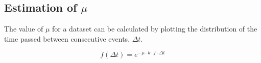 \subsection{Estimation of $\mu$}
\label{subsection: estimation of mu}

The value of $\mu$ for a dataset can be calculated by plotting the distribution of the time passed between consecutive events, $\Delta t$. 

\begin{equation}
	f(\Delta t) = e^{-\mu\cdot k \cdot f \cdot \Delta t}
\end{equation}
